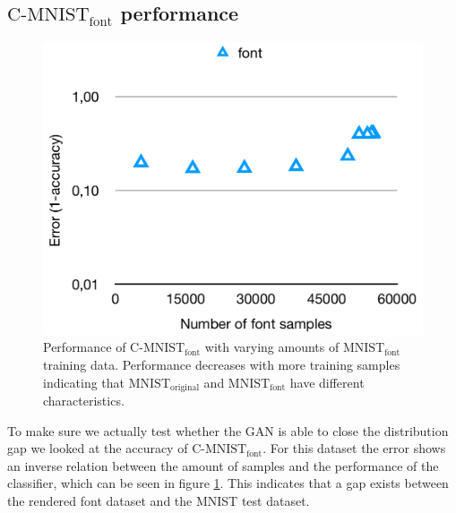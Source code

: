 \documentclass[10pt,twocolumn,letterpaper]{article}
\begin{document}
\subsection{\boldmath\bfseries $\text{C-MNIST}_\text{font}$ performance}
\begin{figure}[h]
\begin{center}
	\includegraphics[width=0.9\linewidth]{../graph-font.png}
\end{center}
   \caption{Performance of $\text{C-MNIST}_\text{font}$ with varying amounts of $\text{MNIST}_\text{font}$ training data. Performance decreases with more training samples indicating that $\text{MNIST}_\text{original}$ and $\text{MNIST}_\text{font}$ have different characteristics.}
\label{fig:graph-font}
\end{figure}

To make sure we actually test whether the GAN is able to close the distribution gap we looked at the accuracy of $\text{C-MNIST}_\text{font}$. For this dataset the error shows an inverse relation between the amount of samples and the performance of the classifier, which can be seen in figure \ref{fig:graph-font}. This indicates that a gap exists between the rendered font dataset and the MNIST test dataset.
\end{document}
